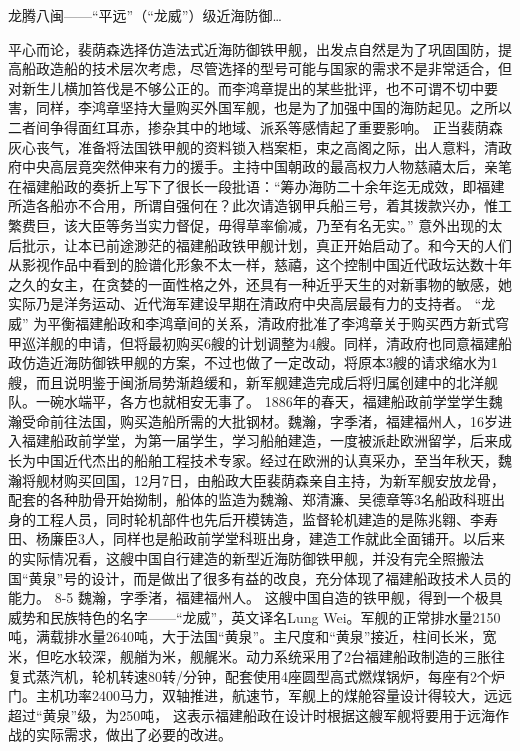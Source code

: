 \documentclass[12pt,UTF8]{ctexbook}
\begin{document}
龙腾八闽——“平远”（“龙威”）级近海防御…

平心而论，裴荫森选择仿造法式近海防御铁甲舰，出发点自然是为了巩固国防，提高船政造船的技术层次考虑，尽管选择的型号可能与国家的需求不是非常适合，但对新生儿横加笞伐是不够公正的。而李鸿章提出的某些批评，也不可谓不切中要害，同样，李鸿章坚持大量购买外国军舰，也是为了加强中国的海防起见。之所以二者间争得面红耳赤，掺杂其中的地域、派系等感情起了重要影响。
正当裴荫森灰心丧气，准备将法国铁甲舰的资料锁入档案柜，束之高阁之际，出人意料，清政府中央高层竟突然伸来有力的援手。主持中国朝政的最高权力人物慈禧太后，亲笔在福建船政的奏折上写下了很长一段批语：“筹办海防二十余年迄无成效，即福建所造各船亦不合用，所谓自强何在？此次请造钢甲兵船三号，着其拨款兴办，惟工繁费巨，该大臣等务当实力督促，毋得草率偷减，乃至有名无实。” 意外出现的太后批示，让本已前途渺茫的福建船政铁甲舰计划，真正开始启动了。和今天的人们从影视作品中看到的脸谱化形象不太一样，慈禧，这个控制中国近代政坛达数十年之久的女主，在贪婪的一面性格之外，还具有一种近乎天生的对新事物的敏感，她实际乃是洋务运动、近代海军建设早期在清政府中央高层最有力的支持者。
“龙威”
为平衡福建船政和李鸿章间的关系，清政府批准了李鸿章关于购买西方新式穹甲巡洋舰的申请，但将最初购买6艘的计划调整为4艘。同样，清政府也同意福建船政仿造近海防御铁甲舰的方案，不过也做了一定改动，将原本3艘的请求缩水为1艘，而且说明鉴于闽浙局势渐趋缓和，新军舰建造完成后将归属创建中的北洋舰队。一碗水端平，各方也就相安无事了。
1886年的春天，福建船政前学堂学生魏瀚受命前往法国，购买造船所需的大批钢材。魏瀚，字季渚，福建福州人，16岁进入福建船政前学堂，为第一届学生，学习船舶建造，一度被派赴欧洲留学，后来成长为中国近代杰出的船舶工程技术专家。经过在欧洲的认真采办，至当年秋天，魏瀚将舰材购买回国，12月7日，由船政大臣裴荫森亲自主持，为新军舰安放龙骨，配套的各种肋骨开始拗制，船体的监造为魏瀚、郑清濂、吴德章等3名船政科班出身的工程人员，同时轮机部件也先后开模铸造，监督轮机建造的是陈兆翱、李寿田、杨廉臣3人，同样也是船政前学堂科班出身，建造工作就此全面铺开。以后来的实际情况看，这艘中国自行建造的新型近海防御铁甲舰，并没有完全照搬法国“黄泉”号的设计，而是做出了很多有益的改良，充分体现了福建船政技术人员的能力。
8-5 魏瀚，字季渚，福建福州人。
这艘中国自造的铁甲舰，得到一个极具威势和民族特色的名字——“龙威”，英文译名Lung Wei。军舰的正常排水量2150吨，满载排水量2640吨，大于法国“黄泉”。主尺度和“黄泉”接近，柱间长米，宽米，但吃水较深，舰艏为米，舰艉米。动力系统采用了2台福建船政制造的三胀往复式蒸汽机，轮机转速80转/分钟，配套使用4座圆型高式燃煤锅炉，每座有2个炉门。主机功率2400马力，双轴推进，航速节，军舰上的煤舱容量设计得较大，远远超过“黄泉”级，为250吨， 这表示福建船政在设计时根据这艘军舰将要用于远海作战的实际需求，做出了必要的改进。
\end{document}
